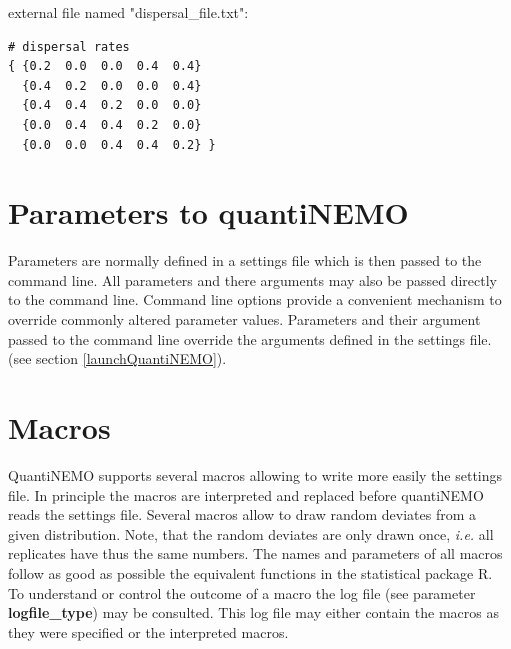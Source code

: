 \documentclass[letterpaper,12pt,oneside]{book}
\begin{document}
external file named "dispersal\_file.txt":
\begin{lstlisting}[frame=single]
# dispersal rates
{ {0.2  0.0  0.0  0.4  0.4}
  {0.4  0.2  0.0  0.0  0.4}
  {0.4  0.4  0.2  0.0  0.0}
  {0.0  0.4  0.4  0.2  0.0}
  {0.0  0.0  0.4  0.4  0.2} }
\end{lstlisting}

\section{Parameters to quantiNEMO}\label{paramInput}
Parameters are normally defined in a settings file which is then passed to the command line. All parameters and there arguments may also be passed directly to the command line. Command line options provide a convenient mechanism to override commonly altered parameter values. Parameters and their argument passed to the command line override the arguments defined in the settings file. (see section \ref{launchQuantiNEMO}). 

\section{Macros}\label{macros}
QuantiNEMO supports several macros allowing to write more easily the settings file. In principle the macros are interpreted and replaced before quantiNEMO reads the settings file. Several macros allow to draw random deviates from a given distribution. Note, that the random deviates are only drawn once, \textit{i.e.} all replicates have thus the same numbers. The names and parameters of all macros follow as good as possible the equivalent functions in the statistical package R. To understand or control the outcome of a macro the log file (see parameter \textbf{logfile\_type}) may be consulted. This log file may either contain the macros as they were specified or the interpreted macros.
\end{document}
